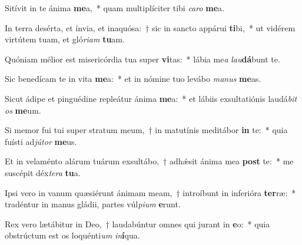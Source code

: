 \item Sitívit in te ánima \textbf{me}a,~* quam multiplíciter tibi \textit{ca}\textit{ro} \textbf{me}a.
\item In terra desérta, et ínvia, et inaquósa:~† sic in sancto appárui \textbf{ti}bi,~* ut vidérem virtútem tuam, et gló\textit{ri}\textit{am} \textbf{tu}am.
\item Quóniam mélior est misericórdia tua super \textbf{vi}tas:~* lábia me\textit{a} \textit{lau}\textbf{dá}bunt te.
\item Sic benedícam te in vita \textbf{me}a:~* et in nómine tuo levábo \textit{ma}\textit{nus} \textbf{me}as.
\item Sicut ádipe et pinguédine repleátur ánima \textbf{me}a:~* et lábiis exsultatiónis laudá\textit{bit} \textit{os} \textbf{me}um.
\item Si memor fui tui super stratum meum,~† in matutínis meditábor \textbf{in} te:~* quia fuísti ad\textit{jú}\textit{tor} \textbf{me}us.
\item Et in velaménto alárum tuárum exsultábo,~† adhǽsit ánima mea \textbf{post} te:~* me suscépit déx\textit{te}\textit{ra} \textbf{tu}a.
\item Ipsi vero in vanum quæsiérunt ánimam meam,~† introíbunt in inferióra \textbf{ter}ræ:~* tradéntur in manus gládii, partes vúl\textit{pi}\textit{um} \textbf{e}runt.
\item Rex vero lætábitur in Deo,~† laudabúntur omnes qui jurant in \textbf{e}o:~* quia obstrúctum est os loquénti\textit{um} \textit{in}\textbf{í}qua.
